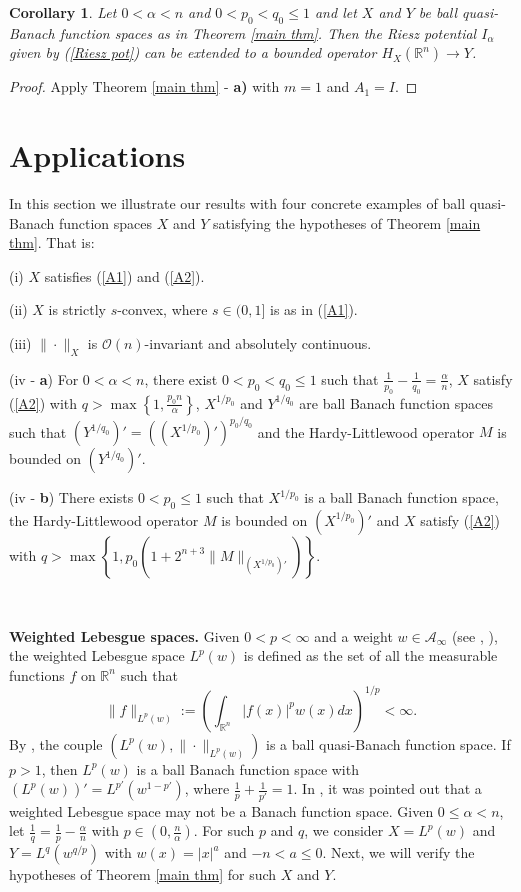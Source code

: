 \documentclass[oneside,10pt]{article}
\newtheorem{corollary}[theorem]{Corollary}
\begin{document}
\begin{corollary} \label{estim riesz}
Let $0 < \alpha < n$ and $0 < p_0 < q_0 \leq 1$ and let $X$ and $Y$ be ball quasi-Banach function spaces as in Theorem \ref{main thm}. Then the Riesz potential $I_{\alpha}$ given by (\ref{Riesz pot}) can be extended to a bounded operator $H_X(\mathbb{R}^n) \to Y$.
\end{corollary}

\begin{proof}
Apply Theorem \ref{main thm} - \textbf{a)} with $m=1$ and $A_1 = I$.
\end{proof}



\section{Applications} \label{appl}

In this section we illustrate our results with four concrete examples of ball quasi-Banach function spaces 
$X$ and $Y$ satisfying the hypotheses of Theorem \ref{main thm}. That is:

(i) $X$ satisfies (\ref{A1}) and (\ref{A2}).

(ii) $X$ is strictly $s$-convex, where $s \in (0,1]$ is as in (\ref{A1}). 

(iii) $\| \cdot \|_X$ is $\mathcal{O}(n)$-invariant and absolutely continuous.

(iv - \textbf{a}) For $0 < \alpha < n$, there exist $0 < p_0 < q_0 \leq 1$ such that $\frac{1}{p_0} - \frac{1}{q_0} = \frac{\alpha}{n}$, $X$ 
satisfy (\ref{A2}) with $q > \max \left\{1, \frac{p_0 n}{\alpha} \right\}$, $X^{1/p_0}$ and $Y^{1/q_0}$ are ball Banach function spaces such that $(Y^{1/q_0})' = ((X^{1/p_0})')^{p_0/q_0}$ and the Hardy-Littlewood operator $M$ is bounded on $(Y^{1/q_0})'$.

(iv - \textbf{b}) There exists $0 < p_0 \leq 1$ such that $X^{1/p_0}$ is a ball Banach function space, the Hardy-Littlewood operator $M$ is bounded on $(X^{1/p_0})'$ and $X$ satisfy (\ref{A2}) with $q > \max \left\{1, p_0 \left(1+2^{n+3} \| M \|_{(X^{1/p_0})'} \right) \right\}$.

\

{\bf Weighted Lebesgue spaces.} Given $0 < p < \infty$ and a weight $w \in \mathcal{A}_{\infty}$ (see \cite{grafakos}, \cite{Stein}), the weighted Lebesgue space $L^{p}(w)$ is defined as the set of all the measurable functions $f$ on $\mathbb{R}^n$ such that
\[
\| f \|_{L^{p}(w)} := \left(  \int_{\mathbb{R}^n} |f(x)|^p w(x) dx \right)^{1/p} < \infty.
\]
By \cite[Section 7.1]{sawa}, the couple $(L^{p}(w), \| \cdot \|_{L^{p}(w)})$ is a ball quasi-Banach function space. If $p > 1$, then 
$L^p(w)$ is a ball Banach function space with $(L^p(w))' = L^{p'}(w^{1-p'})$, where $\frac{1}{p} + \frac{1}{p'} = 1$. 
In \cite[Section 7.1]{sawa}, it was pointed out that a weighted Lebesgue space may not be a Banach function space. Given $0 \leq \alpha < n$, let $\frac{1}{q} = \frac{1}{p} - \frac{\alpha}{n}$ with $p \in (0, \frac{n}{\alpha})$. For such $p$ and $q$, we consider $X=L^p(w)$ and 
$Y = L^q(w^{q/p})$ with $w(x) = |x|^{a}$ and $-n < a \leq 0$. Next, we will verify the hypotheses of Theorem \ref{main thm} for such $X$ and 
$Y$.
\end{document}
